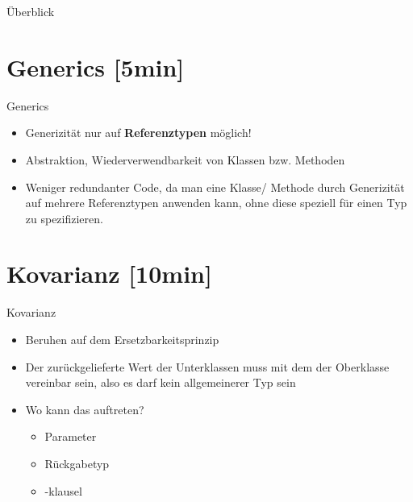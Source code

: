 \documentclass{../tuda-beamer}
\date{19. Januar 2022}
\begin{document}
    \maketitle

    \begin{frame}{Überblick}
        \tableofcontents
    \end{frame}


    \section{Generics [5min]}
    \label{sec:generics}
    \begin{frame}[c]{Generics}
        \begin{itemize}
            \item Generizität nur auf \textbf{Referenztypen} möglich!
            \item Abstraktion, Wiederverwendbarkeit von Klassen bzw. Methoden
            \item Weniger redundanter Code, da man eine Klasse/ Methode durch Generizität auf
            mehrere Referenztypen anwenden kann, ohne diese speziell für einen Typ zu spezifizieren.
        \end{itemize}
    \end{frame}


    \section{Kovarianz [10min]}
    \label{sec:kovarianz}
    \begin{frame}[c]{Kovarianz }
        \begin{itemize}
            \item Beruhen auf dem Ersetzbarkeitsprinzip
            \item Der zurückgelieferte Wert der Unterklassen muss mit dem der Oberklasse
            vereinbar sein, also es darf kein allgemeinerer Typ sein
            \item Wo kann das auftreten?
            \begin{itemize}
                \item Parameter
                \item Rückgabetyp
                \item {}-klausel
            \end{itemize}
        \end{itemize}
    \end{frame}
\end{document}
